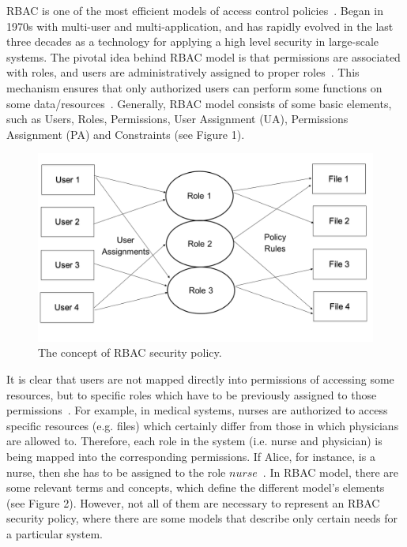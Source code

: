 RBAC is one of the most efficient models of access control policies~\cite{AhHu2007}.  Began in 1970s with multi-user and multi-application, and has rapidly evolved in the last three decades as a technology for applying a high level security in large-scale systems.  The pivotal idea behind RBAC model is that permissions are associated with roles, and users are administratively assigned to proper roles~\cite{Zha2008}. This mechanism ensures that only authorized users can perform some functions on some data/resources~\cite{FeKu2009}. Generally, RBAC model consists of some basic elements, such as Users, Roles, Permissions, User Assignment (UA), Permissions Assignment (PA) and Constraints (see Figure 1).

\begin{figure}[bht]
\centering
\includegraphics[scale=0.26]{RBACpolicy.png}
\caption{The concept of RBAC security policy.}
\label{fig:RBACPol}
\end{figure}


It is clear that users are not mapped directly into permissions of accessing some resources, but to specific roles which have to be previously assigned to those permissions~\cite{YuBr2012}.  For example, in medical systems, nurses are authorized to access specific resources (e.g. files) which certainly differ from those in which physicians are allowed to.  Therefore, each role in the system (i.e. nurse and physician) is being mapped into the corresponding permissions.  If Alice, for instance, is a nurse, then she has to be assigned to the role $nurse$~\cite{DBS2004}. 
      In RBAC model, there are some relevant terms and concepts, which define the different model's elements~\cite{SDAG2008} (see Figure 2).  However, not all of them are necessary to represent an RBAC security policy, where there are some models that describe only certain needs for a particular system.

